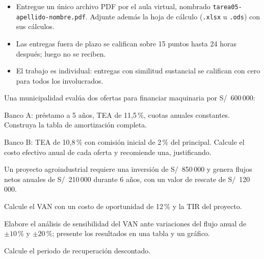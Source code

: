 \documentclass{academic-exam}
\begin{document}
\membrete

\begin{instrucciones}
\begin{itemize}
  \item Entregue un único archivo PDF por el aula virtual, nombrado
        \texttt{tarea05-apellido-nombre.pdf}. Adjunte además la hoja de
        cálculo (\texttt{.xlsx} u \texttt{.ods}) con sus cálculos.
  \item Las entregas fuera de plazo se califican sobre 15 puntos hasta
        24 horas después; luego no se reciben.
  \item El trabajo es individual: entregas con similitud sustancial se
        califican con cero para todos los involucrados.
\end{itemize}
\end{instrucciones}

\begin{ejercicio}
Una municipalidad evalúa dos ofertas para financiar maquinaria por
S/~600\,000:
\begin{apartados}
  \item Banco A: préstamo a 5 años, TEA de 11{,}5\,\%, cuotas anuales
        constantes. Construya la tabla de amortización completa. 
  \item Banco B: TEA de 10{,}8\,\% con comisión inicial de 2\,\% del
        principal. Calcule el costo efectivo anual de cada oferta y
        recomiende una, justificando. 
\end{apartados}
\end{ejercicio}

\begin{ejercicio}
Un proyecto agroindustrial requiere una inversión de S/~850\,000 y genera
flujos netos anuales de S/~210\,000 durante 6 años, con un valor de
rescate de S/~120\,000.
\begin{apartados}
  \item Calcule el VAN con un costo de oportunidad de 12\,\% y la TIR del
        proyecto. 
  \item Elabore el análisis de sensibilidad del VAN ante variaciones del
        flujo anual de $\pm 10\,\%$ y $\pm 20\,\%$; presente los
        resultados en una tabla y un gráfico. 
  \item Calcule el periodo de recuperación descontado. 
\end{apartados}
\end{ejercicio}
\end{document}
